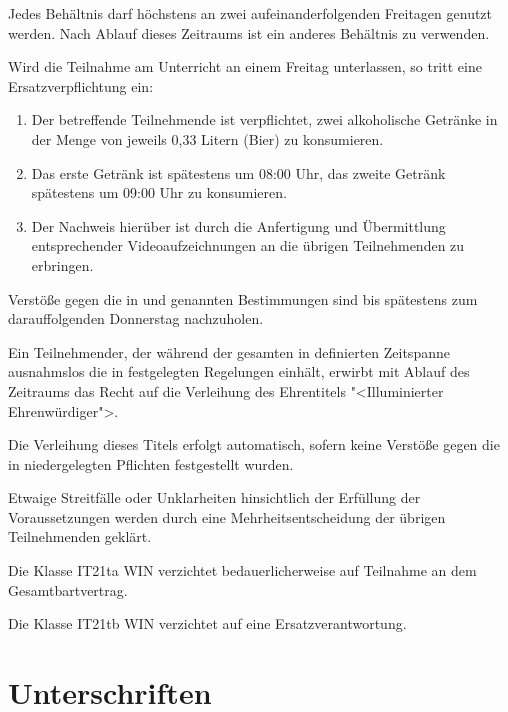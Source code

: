 \documentclass[fontsize=12pt,parskip=half]{scrartcl}
\begin{document}
\begin{contract}
  Jedes Behältnis darf höchstens an zwei aufeinanderfolgenden Freitagen genutzt werden. Nach Ablauf dieses Zeitraums ist ein anderes Behältnis zu verwenden.

  Wird die Teilnahme am Unterricht an einem Freitag unterlassen, so tritt eine Ersatzverpflichtung ein:
  \begin{enumerate}[label=(\alph*)]
    \item Der betreffende Teilnehmende ist verpflichtet, zwei alkoholische Getränke in der Menge von jeweils 0,33 Litern (Bier) zu konsumieren.
    \item Das erste Getränk ist spätestens um 08:00 Uhr, das zweite Getränk spätestens um 09:00 Uhr zu konsumieren.
    \item Der Nachweis hierüber ist durch die Anfertigung und Übermittlung entsprechender Videoaufzeichnungen an die übrigen Teilnehmenden zu erbringen.
  \end{enumerate}

  Verstöße gegen die in  und  genannten Bestimmungen sind bis spätestens zum darauffolgenden Donnerstag nachzuholen.

  \SubClause[title={Verleihung des Titels "<Illuminierter Ehrenwürdiger">}]
  Ein Teilnehmender, der während der gesamten in  definierten Zeitspanne ausnahmslos die in  festgelegten Regelungen einhält,
  erwirbt mit Ablauf des Zeitraums das Recht auf die Verleihung des Ehrentitels "<Illuminierter Ehrenwürdiger">.

  Die Verleihung dieses Titels erfolgt automatisch, sofern keine Verstöße gegen die in  niedergelegten Pflichten festgestellt wurden.

  Etwaige Streitfälle oder Unklarheiten hinsichtlich der Erfüllung der Voraussetzungen werden durch eine Mehrheitsentscheidung der übrigen Teilnehmenden geklärt.

  \Clause[title={Klasse IT21ta WIN}]
  Die Klasse IT21ta WIN verzichtet bedauerlicherweise auf Teilnahme an dem Gesamtbartvertrag.

  \Clause[title={Klasse IT21tb WIN}]
  Die Klasse IT21tb WIN verzichtet auf eine Ersatzverantwortung.
\end{contract}


\pagebreak
\section{Unterschriften}
\end{document}
